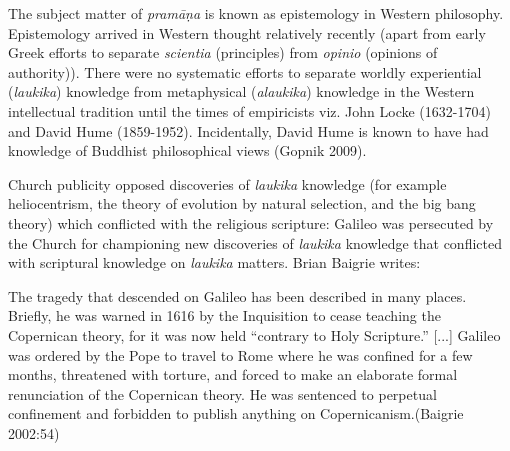 The subject matter of {\sl pramāṇa} is known as epistemology in Western philosophy.  Epistemology arrived in Western thought relatively recently (apart from early Greek efforts to separate {\sl scientia} (principles) from {\sl opinio} (opinions of authority)). There were no systematic efforts to separate worldly experiential ({\sl laukika}) knowledge from metaphysical ({\sl alaukika}) knowledge in the Western intellectual tradition until the times of empiricists viz. John Locke (1632-1704) and David Hume (1859-1952).  Incidentally, David Hume is known to have had knowledge of Buddhist philosophical views (Gopnik 2009).

Church publicity opposed discoveries of {\sl laukika} knowledge (for example heliocentrism, the theory of evolution by natural selection, and the big bang theory) which conflicted with the religious scripture: Galileo was persecuted by the Church for championing new discoveries of {\sl laukika} knowledge that conflicted with scriptural knowledge on {\sl laukika} matters.  Brian Baigrie writes:
\begin{myquote}
The tragedy that descended on Galileo has been described in many places. Briefly, he was warned in 1616 by the Inquisition to cease teaching the Copernican theory, for it was now held ``contrary to Holy Scripture.'' [...] Galileo was ordered by the Pope to travel to Rome where he was confined for a few months, threatened with torture, and forced to make an elaborate formal renunciation of the Copernican theory.  He was sentenced to perpetual confinement and forbidden to publish anything on Copernicanism.\hfill (Baigrie 2002:54)\end{myquote}

